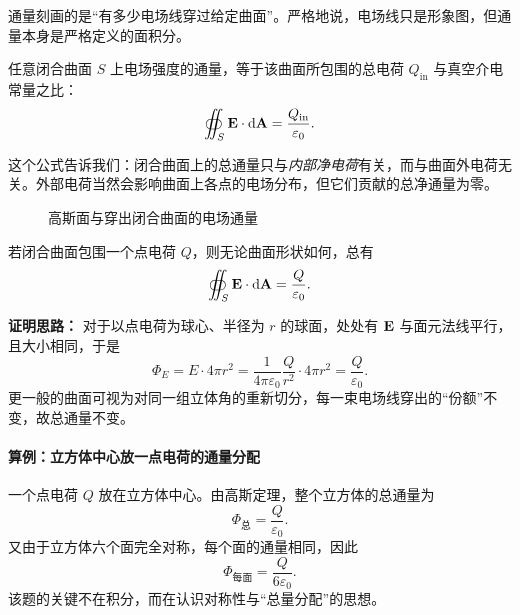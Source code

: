 通量刻画的是“有多少电场线穿过给定曲面”。严格地说，电场线只是形象图，但通量本身是严格定义的面积分。

\begin{law}[高斯定理]
任意闭合曲面 $S$ 上电场强度的通量，等于该曲面所包围的总电荷 $Q_{\text{in}}$ 与真空介电常量之比：
\begin{equation}
\oiint_S \vb{E}\cdot \dd \vb{A} = \frac{Q_{\text{in}}}{\varepsilon_0}.
\end{equation}
\end{law}

这个公式告诉我们：闭合曲面上的总通量只与\emph{内部净电荷}有关，而与曲面外电荷无关。外部电荷当然会影响曲面上各点的电场分布，但它们贡献的总净通量为零。

\begin{figure}[H]
\centering
{}
\caption{高斯面与穿出闭合曲面的电场通量}
\end{figure}

\begin{theorem}[点电荷情形下高斯定理的验证]
若闭合曲面包围一个点电荷 $Q$，则无论曲面形状如何，总有
\begin{equation}
\oiint_S \vb{E}\cdot\dd\vb{A} = \frac{Q}{\varepsilon_0}.
\end{equation}
\end{theorem}

\textbf{证明思路：} 对于以点电荷为球心、半径为 $r$ 的球面，处处有 $\vb{E}$ 与面元法线平行，且大小相同，于是
\begin{equation}
\Phi_E = E\cdot 4\pi r^2 = \frac{1}{4\pi\varepsilon_0}\frac{Q}{r^2}\cdot 4\pi r^2 = \frac{Q}{\varepsilon_0}.
\end{equation}
更一般的曲面可视为对同一组立体角的重新切分，每一束电场线穿出的“份额”不变，故总通量不变。

\paragraph{算例：立方体中心放一点电荷的通量分配} 一个点电荷 $Q$ 放在立方体中心。由高斯定理，整个立方体的总通量为
\begin{equation}
\Phi_{\text{总}} = \frac{Q}{\varepsilon_0}.
\end{equation}
又由于立方体六个面完全对称，每个面的通量相同，因此
\begin{equation}
\Phi_{\text{每面}} = \frac{Q}{6\varepsilon_0}.
\end{equation}
该题的关键不在积分，而在认识对称性与“总量分配”的思想。

